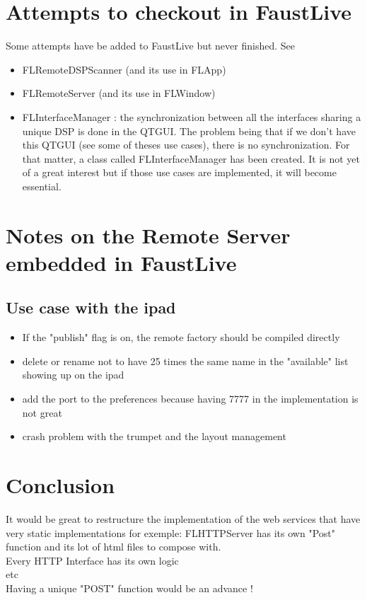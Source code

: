 \documentclass[a4paper]{article}
\begin{document}
\section{Attempts to checkout in FaustLive}

Some attempts have be added to FaustLive but never finished. See
\begin{itemize}
\item FLRemoteDSPScanner (and its use in FLApp)
\item FLRemoteServer (and its use in FLWindow)
\item FLInterfaceManager : the synchronization between all the interfaces sharing a unique DSP is done in the QTGUI. The problem being that if we don't have this QTGUI (see some of theses use cases), there is no synchronization. For that matter, a class called FLInterfaceManager has been created. It is not yet of a great interest but if those use cases are implemented, it will become essential.
\end{itemize}

\section{Notes on the Remote Server embedded in FaustLive}
\subsection{Use case with the ipad}
\begin{itemize}
\item If the "publish" flag is on, the remote factory should be compiled directly
\item delete or rename not to have 25 times the same name in the "available" list showing up on the ipad
\item add the port to the preferences because having 7777 in the implementation is not great
\item crash problem with the trumpet and the layout management

\end{itemize}

\section{Conclusion}

It would be great to restructure the implementation of the web services that have very static implementations for exemple:
FLHTTPServer has its own "Post" function and its lot of html files to compose with. \\
Every HTTP Interface has its own logic \\
etc \\

Having a unique "POST" function would be an advance !
\end{document}
